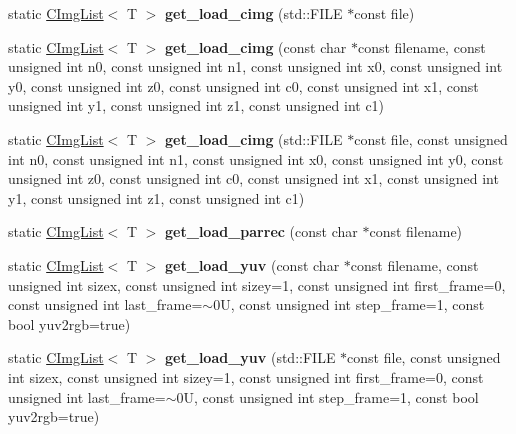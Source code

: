 \begin{DoxyCompactItemize}
\item 
\hypertarget{structcimg__library_1_1CImgList_a3d8408137d89b116ba448d357684e0c9}{
static \hyperlink{structcimg__library_1_1CImgList}{CImgList}$<$ T $>$ {\bfseries get\_\-load\_\-cimg} (std::FILE $\ast$const file)}
\label{structcimg__library_1_1CImgList_a3d8408137d89b116ba448d357684e0c9}

\item 
\hypertarget{structcimg__library_1_1CImgList_a4d42b148b5b847c53c0972e21ccbf154}{
static \hyperlink{structcimg__library_1_1CImgList}{CImgList}$<$ T $>$ {\bfseries get\_\-load\_\-cimg} (const char $\ast$const filename, const unsigned int n0, const unsigned int n1, const unsigned int x0, const unsigned int y0, const unsigned int z0, const unsigned int c0, const unsigned int x1, const unsigned int y1, const unsigned int z1, const unsigned int c1)}
\label{structcimg__library_1_1CImgList_a4d42b148b5b847c53c0972e21ccbf154}

\item 
\hypertarget{structcimg__library_1_1CImgList_a79a875c73c5db8a37c1637f65a82f4ac}{
static \hyperlink{structcimg__library_1_1CImgList}{CImgList}$<$ T $>$ {\bfseries get\_\-load\_\-cimg} (std::FILE $\ast$const file, const unsigned int n0, const unsigned int n1, const unsigned int x0, const unsigned int y0, const unsigned int z0, const unsigned int c0, const unsigned int x1, const unsigned int y1, const unsigned int z1, const unsigned int c1)}
\label{structcimg__library_1_1CImgList_a79a875c73c5db8a37c1637f65a82f4ac}

\item 
\hypertarget{structcimg__library_1_1CImgList_aca5a8ad3bb0c44264af7c25cf82536b0}{
static \hyperlink{structcimg__library_1_1CImgList}{CImgList}$<$ T $>$ {\bfseries get\_\-load\_\-parrec} (const char $\ast$const filename)}
\label{structcimg__library_1_1CImgList_aca5a8ad3bb0c44264af7c25cf82536b0}

\item 
\hypertarget{structcimg__library_1_1CImgList_acf9e5bdd2d8ca89b78d44da13ba66e71}{
static \hyperlink{structcimg__library_1_1CImgList}{CImgList}$<$ T $>$ {\bfseries get\_\-load\_\-yuv} (const char $\ast$const filename, const unsigned int sizex, const unsigned int sizey=1, const unsigned int first\_\-frame=0, const unsigned int last\_\-frame=$\sim$0U, const unsigned int step\_\-frame=1, const bool yuv2rgb=true)}
\label{structcimg__library_1_1CImgList_acf9e5bdd2d8ca89b78d44da13ba66e71}

\item 
\hypertarget{structcimg__library_1_1CImgList_aa1f2db8292397b3f7060fe66e6eca7af}{
static \hyperlink{structcimg__library_1_1CImgList}{CImgList}$<$ T $>$ {\bfseries get\_\-load\_\-yuv} (std::FILE $\ast$const file, const unsigned int sizex, const unsigned int sizey=1, const unsigned int first\_\-frame=0, const unsigned int last\_\-frame=$\sim$0U, const unsigned int step\_\-frame=1, const bool yuv2rgb=true)}
\label{structcimg__library_1_1CImgList_aa1f2db8292397b3f7060fe66e6eca7af}


\end{DoxyCompactItemize}
